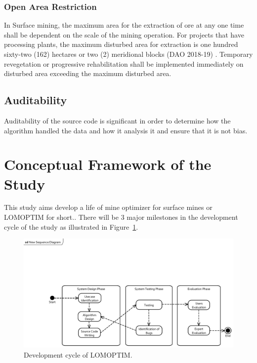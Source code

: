 \documentclass[12pt]{report}
\begin{document}
\subsubsection{Open Area Restriction}
In Surface mining, the maximum area for the extraction of ore at any one time shall be dependent on the scale of the mining operation.
For projects that have processing plants, the maximum disturbed area for extraction is one hundred sixty-two (162) hectares or two (2) meridional blocks (DAO 2018-19) \cite{DAO2018-19}.
Temporary revegetation or progressive rehabilitation shall be implemented immediately on disturbed area exceeding the maximum disturbed area.

\subsection{Auditability}

Auditability of the source code is significant in order to determine how the algorithm handled the data and how it analysis it and ensure that it is not bias. 

\section{Conceptual Framework of the Study}

This study aims develop a life of mine optimizer for surface mines or LOMOPTIM for short..
There will be 3 major milestones in the development cycle of the study as illustrated in Figure~\ref{fig:conceptual_framework}.

\begin{figure}[p]
    \centering
    \includegraphics[clip, trim=30mm 2mm 2mm 33mm, width=\linewidth]{img/conceptual_framework.pdf}
    \caption{Development cycle of LOMOPTIM.}
    \label{fig:conceptual_framework}
\end{figure}
\end{document}
